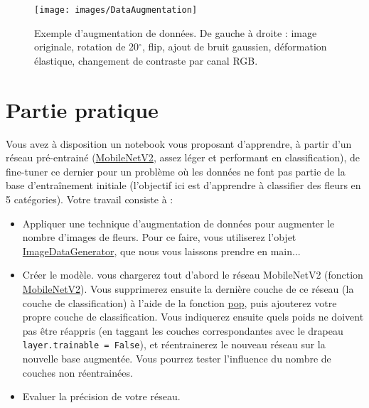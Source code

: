 \documentclass{DocBleu}
\begin{document}
\begin{figure}[ht!]
\centering
\texttt{[image: images/DataAugmentation]}

\caption{Exemple d'augmentation de donn\'ees. De gauche \`a droite : image originale, rotation de 20$^{\circ}$, flip, ajout de bruit gaussien, déformation élastique, changement de contraste par canal RGB.} 
\label{Fig:dataAug}
\end{figure}


\section{Partie pratique}
Vous avez à disposition un notebook vous proposant d'apprendre, à partir d'un réseau pré-entrainé (\href{https://arxiv.org/abs/1801.04381}{MobileNetV2}, assez léger et performant en classification), de fine-tuner ce dernier pour un problème où les données ne font pas partie de la base d'entraînement initiale (l'objectif ici est d'apprendre à classifier des fleurs en 5 catégories). Votre travail consiste à :
\begin{itemize}
\item Appliquer une technique d'augmentation de données pour augmenter le nombre d'images de fleurs. Pour ce faire, vous utiliserez l'objet \href{https://www.tensorflow.org/api_docs/python/tf/keras/preprocessing/image/ImageDataGenerator}{ImageDataGenerator}, que nous vous laissons prendre en main...
\item Créer le modèle. vous chargerez  tout d'abord le réseau MobileNetV2 (fonction \href{https://www.tensorflow.org/api_docs/python/tf/keras/applications/MobileNetV2}{MobileNetV2}). Vous supprimerez ensuite la dernière couche de ce réseau (la couche de classification) à l'aide de la fonction \href{https://keras.io/guides/sequential_model/}{pop}, puis ajouterez votre propre couche de classification. Vous indiquerez  ensuite quels poids ne doivent pas être réappris (en taggant les couches correspondantes avec le drapeau \texttt{layer.trainable = False}), et réentrainerez le nouveau réseau sur la nouvelle base augmentée. Vous pourrez tester l'influence du nombre de couches non réentrainées.
\item Evaluer la précision de votre réseau.
\end{itemize}




\end{document}
